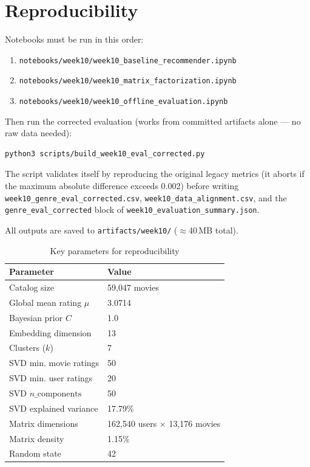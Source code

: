 \documentclass[12pt,a4paper]{article}
\begin{document}
\section{Reproducibility}

Notebooks must be run in this order:
\begin{enumerate}[nosep]
  \item \texttt{notebooks/week10/week10\_baseline\_recommender.ipynb}
  \item \texttt{notebooks/week10/week10\_matrix\_factorization.ipynb}
  \item \texttt{notebooks/week10/week10\_offline\_evaluation.ipynb}
\end{enumerate}

Then run the corrected evaluation (works from committed artifacts alone --- no raw data needed):

\begin{lstlisting}[language=bash]
python3 scripts/build_week10_eval_corrected.py
\end{lstlisting}

The script validates itself by reproducing the original legacy metrics (it aborts if the
maximum absolute difference exceeds 0.002) before writing
\texttt{week10\_genre\_eval\_corrected.csv}, \texttt{week10\_data\_alignment.csv}, and the
\texttt{genre\_eval\_corrected} block of \texttt{week10\_evaluation\_summary.json}.

All outputs are saved to \texttt{artifacts/week10/} ($\approx$40\,MB total).

\begin{table}[H]
\centering
\caption{Key parameters for reproducibility}
\begin{tabular}{ll}
\toprule
\textbf{Parameter} & \textbf{Value} \\
\midrule
Catalog size & 59,047 movies \\
Global mean rating $\mu$ & 3.0714 \\
Bayesian prior $C$ & 1.0 \\
Embedding dimension & 13 \\
Clusters ($k$) & 7 \\
SVD min. movie ratings & 50 \\
SVD min. user ratings & 20 \\
SVD $n\_\text{components}$ & 50 \\
SVD explained variance & 17.79\% \\
Matrix dimensions & 162,540 users $\times$ 13,176 movies \\
Matrix density & 1.15\% \\
Random state & 42 \\
\bottomrule
\end{tabular}
\end{table}
\end{document}
